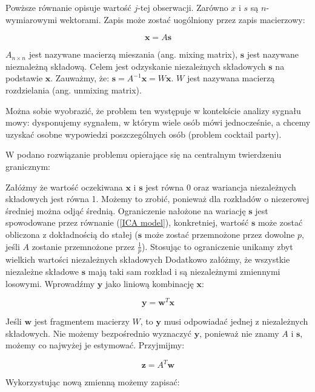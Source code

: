 \documentclass[oneside, eng]{mgr}
\newcommand{\bb}{\textbf}
\begin{document}
Powższe równanie opisuje wartość $j$-tej obserwacji. Zarówno $x$ i $s$ są $n$-wymiarowymi wektorami. Zapis może zostać uogólniony przez zapis macierzowy:

\begin{equation}
	\bb{x} = A \bb{s}
	\label{ICA model}
\end{equation}

$A_{n \times n}$ jest nazywane macierzą mieszania (ang. mixing matrix), $\bb{s}$ jest nazywane nieznależną składową. Celem jest odzyskanie niezależnych składowych $\bb{s}$ na podstawie $\bb{x}$. Zauważmy, że: $\bb{s} = A^{-1}\bb{x} = W \bb{x}$. $W$ jest nazywana macierzą rozdzielania (ang. unmixing matrix). 

Można sobie wyobrazić, że problem ten występuje w kontekście analizy sygnału mowy: dysponujemy sygnałem, w którym wiele osób mówi jednocześnie, a chcemy uzyskać osobne wypowiedzi poszczególnych osób (problem cocktail party). 

W \cite{ICA} podano rozwiązanie problemu opierające się na centralnym twierdzeniu granicznym:

Załóżmy że wartość oczekiwana $\bb{x}$ i $\bb{s}$ jest równa 0 oraz wariancja niezależnych składowych jest równa 1. Możemy to zrobić, ponieważ dla rozkładów o niezerowej średniej można odjąć średnią. Ograniczenie nałożone na wariację $\bb{s}$ jest spowodowane przez równanie (\ref{ICA model}), konkretniej, wartość $\bb{s}$ może zostać obliczona z dokładnością do stałej ($\bb{s}$ może zostać przemnożone przez dowolne $p$, jeśli $A$ zostanie przemnożone przez $\frac{1}{p}$). Stosując to ograniczenie unikamy zbyt wielkich wartości niezależnych składowych  Dodatkowo załóżmy, że wszystkie niezależne składowe $\bb{s}$ mają taki sam rozkład i są niezależnymi zmiennymi losowymi. Wprowadźmy $\bb{y}$ jako liniową kombinację $\bb{x}$:

\begin{equation}
	\bb{y} = \bb{w}^T \bb{x}
\end{equation}

Jeśli $\bb{w}$ jest fragmentem macierzy $W$, to $\bb{y}$ musi odpowiadać jednej z niezależnych składowych. Nie możemy bezpośrednio wyznaczyć $\bb{y}$, ponieważ nie znamy $A$ i $\bb{s}$, możemy co najwyżej je estymować. Przyjmijmy:

\begin{equation}
	\bb{z} = A^T \bb{w}
\end{equation}

Wykorzystując nową zmienną możemy zapisać:
\end{document}
